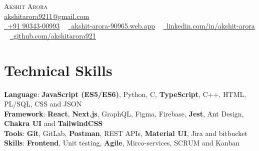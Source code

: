 \documentclass[letterpaper,11pt]{article}
\begin{document}
\begin{center}
    {\Huge \scshape Akshit Arora} \\ \vspace{1pt}
    \href{mailto:akshitarora9211@gmail.com}{ \underline{akshitarora9211@gmail.com}}\\ \vspace{1pt}
    \small\href{tel:+91 9034300993}{\raisebox{-0.2\height}\faPhone\  \underline{+91 90343-00993}} ~ \href{https://akshit-arora-90965.web.app/}{\raisebox{-0.2\height}\faLink\  \underline{akshit-arora-90965.web.app}} ~ 
    \href{https://www.linkedin.com/in/akshit-arora/}{\raisebox{-0.2\height}\faLinkedin\ \underline{linkedin.com/in/akshit-arora}}  ~
    \href{https://github.com/akshitarora921}{\raisebox{-0.2\height}\faGithub\ \underline{github.com/akshitarora921}}
    \vspace{-8pt}
\end{center}
\section{Technical Skills}
 \begin{itemize}[leftmargin=0.15in, label={}]
    \small{\item{
     \textbf{Language}{: \textbf{JavaScript (ES5/ES6)}, Python, C,  \textbf{TypeScript}, C++, HTML, PL/SQL, CSS and JSON} \\
     \textbf{Framework}{:  \textbf{React}, \textbf{Next.js}, GraphQL, Figma, Firebase, \textbf{Jest}, Ant Design, \textbf{Chakra UI} and \textbf{TailwindCSS} } \\
     \textbf{Tools}{: \textbf{Git}, GitLab, \textbf{Postman}, REST APIs, \textbf{Material UI}, Jira and bitbucket}\\
     \textbf{Skills}{: \textbf{Frontend}, Unit testing, \textbf{Agile}, Mirco-services, SCRUM and Kanban}\\
    }}
 \end{itemize}
 \vspace{-16pt}
\end{document}
